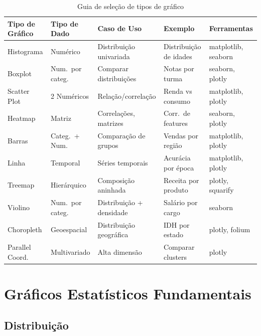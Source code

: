 \documentclass[12pt,a4paper]{article}
\begin{document}
\begin{table}[ht]
\centering
\small
\caption{Guia de seleção de tipos de gráfico}
\begin{tabular}{@{}p{2.8cm}p{2.2cm}p{3cm}p{2.5cm}p{2.5cm}@{}}
\toprule
\textbf{Tipo de Gráfico} & \textbf{Tipo de Dado} & \textbf{Caso de Uso} & \textbf{Exemplo} & \textbf{Ferramentas} \\
\midrule
Histograma & Numérico & Distribuição univariada & Distribuição de idades & matplotlib, seaborn \\
Boxplot & Num.\ por categ. & Comparar distribuições & Notas por turma & seaborn, plotly \\
Scatter Plot & 2 Numéricos & Relação/correlação & Renda vs consumo & matplotlib, plotly \\
Heatmap & Matriz & Correlações, matrizes & Corr.\ de features & seaborn, plotly \\
Barras & Categ.\ + Num. & Comparação de grupos & Vendas por região & matplotlib, plotly \\
Linha & Temporal & Séries temporais & Acurácia por época & matplotlib, plotly \\
Treemap & Hierárquico & Composição aninhada & Receita por produto & plotly, squarify \\
Violino & Num.\ por categ. & Distribuição + densidade & Salário por cargo & seaborn \\
Choropleth & Geoespacial & Distribuição geográfica & IDH por estado & plotly, folium \\
Parallel Coord. & Multivariado & Alta dimensão & Comparar clusters & plotly \\
\bottomrule
\end{tabular}
\end{table}

\section{Gráficos Estatísticos Fundamentais}

\subsection{Distribuição}
\end{document}
